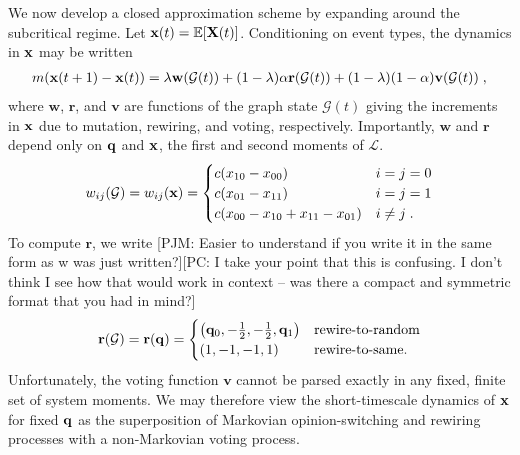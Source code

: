 \documentclass[review, onefignum, onetabnum]{siamart171218}
\newcommand{\pjm}[1]{{\color{blue}[PJM: #1]}}
\newcommand{\pc}[1]{{\color{comment_purple}[PC: #1]}}
\begin{document}
	We now develop a closed approximation scheme by expanding around the subcritical regime. 
	Let $\mathbf{x}(t) = \mathbb{E}[\mathbf{X}(t)]$. 
	Conditioning on event types, the dynamics in $\mathbf{x}$ may be written
	\begin{align}
		m(\x(t+1) - \x(t)) = \lambda \mathbf{w}(\mathcal{G}(t)) + (1-\lambda)\alpha \mathbf{r}(\mathcal{G}(t)) + (1-\lambda)(1-\alpha) \mathbf{v}(\mathcal{G}(t))\;, \label{eq:dynamics}
	\end{align}
	where $\mathbf{w}$, $\mathbf{r}$, and $\mathbf{v}$ are functions of the graph state $\mathcal{G}(t)$ giving the increments in $\mathbf{x}$ due to mutation, rewiring, and voting, respectively. 
	Importantly, $\mathbf{w}$ and $\mathbf{r}$ depend only on $\mathbf{q}$ and $\mathbf{x}$, the first and second moments of $\mathcal{L}$. 
	\begin{align*}
		w_{ij}(\mathcal{G}) = w_{ij}(\mathbf{x}) = 
		\begin{cases}
			c(x_{10} - x_{00}) &  i = j = 0 \\ 
			c (x_{01}-x_{11}) & i = j = 1 \\ 
			c (x_{00}  - x_{10}+x_{11}-x_{01}) & i \neq j\;.
		\end{cases}
	\end{align*}
	To compute $\mathbf{r}$, we write \pjm{Easier to understand if you write it in the same form as w was just written?}\pc{I take your point that this is confusing. I don't think I see how that would work in context -- was there a compact and symmetric format that you had in mind?}
	\begin{align*}
		\mathbf{r}(\mathcal{G}) = \mathbf{r}(\mathbf{q}) = 
		\begin{cases}
			\left(\mathbf{q}_0, -\frac{1}{2}, -\frac{1}{2}, \mathbf{q}_1\right) & \text{rewire-to-random}\\
			\left(1, -1, -1, 1\right) & \text{rewire-to-same}.
		\end{cases}
	\end{align*}
	Unfortunately, the voting function $\mathbf{v}$ cannot be parsed exactly in any fixed, finite set of system moments.  
	We may therefore view the short-timescale dynamics of $\mathbf{x}$ for fixed $\mathbf{q}$ as the superposition of Markovian opinion-switching and rewiring processes with a non-Markovian voting process. 
	
\end{document}
